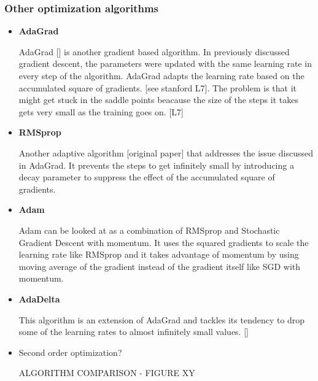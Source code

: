 \subsubsection{Other optimization algorithms}
\begin{itemize}
	\item \textbf{AdaGrad}
	
	AdaGrad [] is another gradient based algorithm. In previously discussed gradient descent, the parameters were updated with the same learning rate in every step of the algorithm. AdaGrad adapts the learning rate based on the accumulated square of gradients. [see stanford L7]. The problem is that it might get stuck in the saddle points beacause the size of the steps it takes gets very small as the training goes on. [L7]
	
	\item \textbf{RMSprop}
	
	Another adaptive algorithm [original paper] that addresses the issue discussed in AdaGrad. It prevents the steps to get infinitely small by introducing a decay parameter to suppress the effect of the accumulated square of gradients.	
	
	\item \textbf{Adam}
	
	Adam can be looked at as a combination of RMSprop and Stochastic Gradient Descent with momentum. It uses the squared gradients to scale the learning rate like RMSprop and it takes advantage of momentum by using moving average of the gradient instead of the gradient itself like SGD with momentum. %
	
	\item \textbf{AdaDelta}
	
	This algorithm is an extension of AdaGrad and tackles its tendency to drop some of the learning rates to almost infinitely small values. []
	
	\item Second order optimization?
	
	ALGORITHM COMPARISON - FIGURE XY
\end{itemize}

